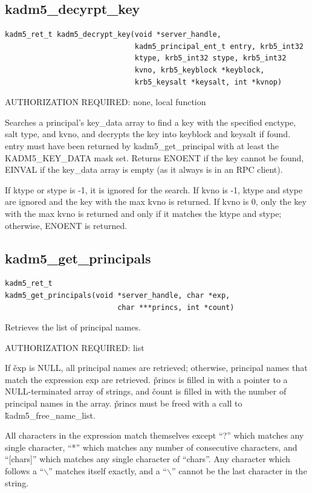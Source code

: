\subsection{kadm5_decyrpt_key}

\begin{verbatim}
kadm5_ret_t kadm5_decrypt_key(void *server_handle,
                              kadm5_principal_ent_t entry, krb5_int32
                              ktype, krb5_int32 stype, krb5_int32
                              kvno, krb5_keyblock *keyblock,
                              krb5_keysalt *keysalt, int *kvnop)
\end{verbatim}

AUTHORIZATION REQUIRED: none, local function

Searches a principal's key_data array to find a key with the specified
enctype, salt type, and kvno, and decrypts the key into keyblock and
keysalt if found.  entry must have been returned by
kadm5_get_principal with at least the KADM5_KEY_DATA mask set.
Returns ENOENT if the key cannot be found, EINVAL if the key_data
array is empty (as it always is in an RPC client).

If ktype or stype is -1, it is ignored for the search.  If kvno is -1,
ktype and stype are ignored and the key with the max kvno is returned.
If kvno is 0, only the key with the max kvno is returned and only if
it matches the ktype and stype; otherwise, ENOENT is returned.

\subsection{kadm5_get_principals}

\begin{verbatim}
kadm5_ret_t
kadm5_get_principals(void *server_handle, char *exp,
                          char ***princs, int *count)
\end{verbatim}

Retrieves the list of principal names.

AUTHORIZATION REQUIRED: list

If \v{exp} is NULL, all principal names are retrieved; otherwise,
principal names that match the expression exp are retrieved.
\v{princs} is filled in with a pointer to a NULL-terminated array of
strings, and \v{count} is filled in with the number of principal names
in the array.  \v{princs} must be freed with a call to
\v{kadm5_free_name_list}.

All characters in the expression match themselves except ``?'' which
matches any single character, ``*'' which matches any number of
consecutive characters, and ``[chars]'' which matches any single
character of ``chars''. Any character which follows a ``$\backslash$''
matches itself exactly, and a ``$\backslash$'' cannot be the last
character in the string.

